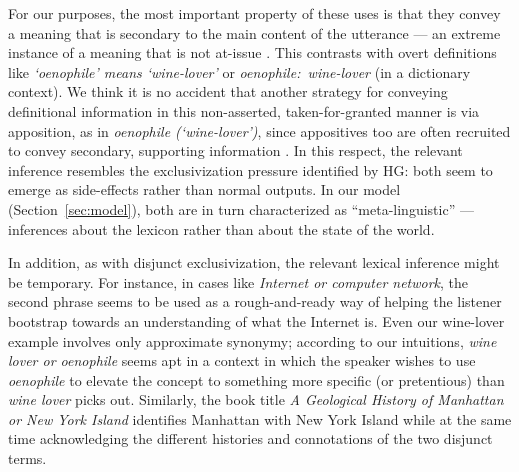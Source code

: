 \documentclass[12pt,twoside]{article}
\newcommand{\secref}[1]{Section~\ref{#1}}
\newcommand{\word}[1]{\emph{#1}}
\renewcommand{\_}{\textbf{\textunderscore\hspace{-4pt}\textunderscore\hspace{-3pt}\textunderscore\hspace{-4pt}\textunderscore}\hspace{0.5pt}}			%
\begin{document}
For our purposes, the most important property of these uses is that
they convey a meaning that is secondary to the main content of the
utterance --- an extreme instance of a meaning that is not at-issue
\citep{Tonhauser-etal:2011,Dillon-etal:2014}. This contrasts with
overt definitions like \word{`oenophile' means `wine-lover'} or
\word{oenophile:~wine-lover} (in a dictionary context).  We think it
is no accident that another strategy for conveying definitional
information in this non-asserted, taken-for-granted manner is via
apposition, as in \word{oenophile (`wine-lover')}, since appositives
too are often recruited to convey secondary, supporting information
\citep{Potts05BOOK,Potts08HSK,Syrett-etal:2014}. In this respect, the
relevant inference resembles the exclusivization pressure identified
by HG: both seem to emerge as side-effects rather than normal
outputs. In our model (\secref{sec:model}), both are in turn
characterized as ``meta-linguistic'' --- inferences about the lexicon
rather than about the state of the world.

In addition, as with disjunct exclusivization, the relevant lexical
inference might be temporary. For instance, in cases like
\word{Internet or computer network}, the second phrase seems to be
used as a rough-and-ready way of helping the listener bootstrap
towards an understanding of what the Internet is. Even our wine-lover
example involves only approximate synonymy; according to our
intuitions, \word{wine lover or oenophile} seems apt in a context in
which the speaker wishes to use \word{oenophile} to elevate the
concept to something more specific (or pretentious) than \word{wine
  lover} picks out. Similarly, the book title \emph{A Geological
  History of Manhattan or New York Island} identifies Manhattan with
New York Island while at the same time acknowledging the different
histories and connotations of the two disjunct terms.
\end{document}
